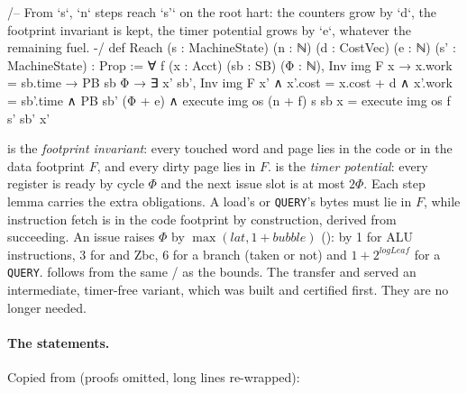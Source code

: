 \begin{leancode}
/-- From `s`, `n` steps reach `s'` on the root hart: the counters grow by `d`, the
footprint invariant is kept, the timer potential grows by `e`, whatever the remaining
fuel. -/
def Reach (s : MachineState) (n : ℕ) (d : CostVec) (e : ℕ) (s' : MachineState) :
    Prop :=
  ∀ f (x : Acct) (sb : SB) (Φ : ℕ), Inv img F x → x.work = sb.time → PB sb Φ →
    ∃ x' sb', Inv img F x' ∧ x'.cost = x.cost + d ∧ x'.work = sb'.time ∧
      PB sb' (Φ + e) ∧
      execute img os (n + f) {} s sb x = execute img os f {} s' sb' x'
\end{leancode}

 is the \emph{footprint invariant}: every touched word and page lies in the code or
in the data footprint $F$, and every dirty page lies in $F$.  is the \emph{timer
potential}: every register is ready by cycle $\Phi$ and the next issue slot is at most $2\Phi$. Each
step lemma carries the extra obligations. A load's or \texttt{QUERY}'s bytes must lie in $F$, while
instruction fetch is in the code footprint by construction, derived from  succeeding. An
issue raises $\Phi$ by $\max(\mathit{lat},1+\mathit{bubble})$ (): by 1 for ALU
instructions, 3 for  and Zbc, 6 for a branch (taken or not) and $1+2^{\mathit{logLeaf}}$ for
a \texttt{QUERY}.  follows from the same / as the
bounds. The  transfer and  served an intermediate, timer-free variant,
which was built and certified first. They are no longer needed.

\paragraph{The statements.} Copied from  (proofs omitted, long lines
re-wrapped):

